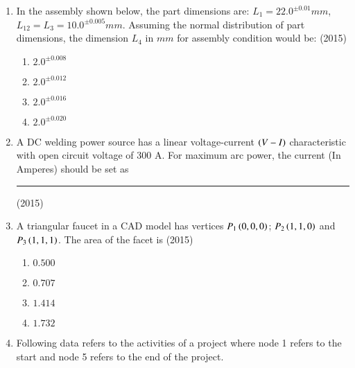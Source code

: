 \documentclass[journal]{IEEEtran}
\begin{document}
\begin{enumerate}
\setcounter{enumi}{0}

    \item In the assembly shown below, the part dimensions are: $L_1=22.0^{\pm0.01}mm$, $L_12=L_3=10.0^{\pm0.005}mm$. Assuming the normal distribution of part dimensions, the dimension $L_4$ in $mm$ for assembly condition would be:
    \hfill{(2015)}

    
    

    \begin{multicols}{4}
        \begin{enumerate}
            \item $2.0^{\pm0.008}$
            \item $2.0^{\pm0.012}$
            \item $2.0^{\pm0.016}$
            \item $2.0^{\pm0.020}$
        \end{enumerate}
    \end{multicols}

    \item A DC welding power source has a linear voltage-current $\left(V-I\right)$ characteristic with open circuit voltage of 300 A. For maximum arc power, the current (In Amperes) should be set as \rule{1cm}{0.15mm}
    \hfill{(2015)}

    \item A triangular faucet in a CAD model has vertices $P_1\left(0,0,0\right)$; $P_2\left(1,1,0\right)$ and $P_3\left(1,1,1\right)$. The area of the facet is
    \hfill{(2015)}

    \begin{multicols}{4}
        \begin{enumerate}
            \item $0.500$
            \item $0.707$
            \item $1.414$
            \item $1.732$
        \end{enumerate}
    \end{multicols}


    \item Following data refers to the activities of a project where node 1 refers to the start and node 5 refers to the end of the project.

    \begin{table}[h]
        \centering
        
        \label{tab:43}
    \end{table}


\end{enumerate}
\end{document}
